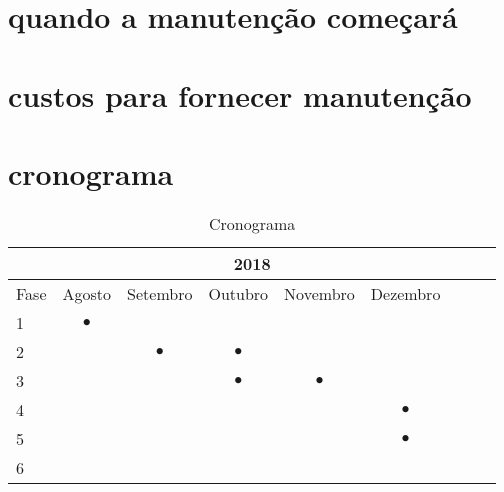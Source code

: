 \section{quando a manutenção começará}

\section{custos para fornecer manutenção}

\section{cronograma}
\begin{table}[!htb]
  \caption{Cronograma}
  \label{tab:cronograma}
  \begin{center}
  \begin{tabular}{l||c|c|c|c|c|c|c|c}
    \hline
    \multicolumn{9}{c}{2018} \\ \hline \hline
    \multicolumn{1}{c||}{Fase} 
         &  Agosto   &  Setembro & Outubro  & Novembro & Dezembro  \\ \hline
    1    & $\bullet$ &           &          &          &           \\
    2    &           & $\bullet$ & $\bullet$&          &           \\
    3    &           &           & $\bullet$& $\bullet$&           \\
    4    &           &           &          &          & $\bullet$ \\
    5    &           &           &          &          & $\bullet$ \\
    6    &           &           &          &          &           \\
    \hline
  \end{tabular}
  \end{center}
  \end{table}
